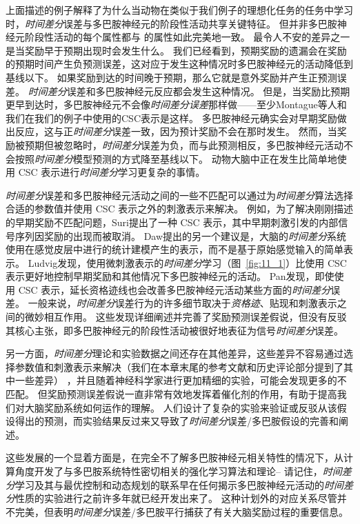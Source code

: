 上面描述的例子解释了为什么当动物在类似于我们例子的理想化任务的任务中学习时，\textit{时间差分}误差与多巴胺神经元的阶段性活动共享关键特征。
但并非多巴胺神经元阶段性活动的每个属性都与 的属性如此完美地一致。
最令人不安的差异之一是当奖励早于预期出现时会发生什么。
我们已经看到，预期奖励的遗漏会在奖励的预期时间产生负预测误差，这对应于发生这种情况时多巴胺神经元的活动降低到基线以下。
如果奖励到达的时间晚于预期，那么它就是意外奖励并产生正预测误差。
\textit{时间差分}误差和多巴胺神经元反应都会发生这种情况。
但是，当奖励比预期更早到达时，多巴胺神经元不会像\textit{时间差分误差}那样做——至少Montague等人\cite{montague1996framework}和我们在我们的例子中使用的CSC表示是这样。
多巴胺神经元确实会对早期奖励做出反应，这与正\textit{时间差分}误差一致，因为预计奖励不会在那时发生。
然而，当奖励被预期但被忽略时，\textit{时间差分}误差为负，而与此预测相反，多巴胺神经元活动不会按照\textit{时间差分}模型预测的方式降至基线以下\cite{hollerman1998dopamine}。
动物大脑中正在发生比简单地使用 CSC 表示进行\textit{时间差分}学习更复杂的事情。



\textit{时间差分}误差和多巴胺神经元活动之间的一些不匹配可以通过为\textit{时间差分}算法选择合适的参数值并使用 CSC 表示之外的刺激表示来解决。
例如，为了解决刚刚描述的早期奖励不匹配问题，Suri\cite{suri1999neural}提出了一种 CSC 表示，其中早期刺激引发的内部信号序列因奖励的出现而被取消。
Daw\cite{daw2006representation}提出的另一个建议是，大脑的\textit{时间差分}系统使用在感觉皮层中进行的统计建模产生的表示，而不是基于原始感觉输入的简单表示。
Ludvig\cite{ludvig2008stimulus}发现，使用微刺激表示的\textit{时间差分}学习（图~\ref{fig:11_1}）比使用 CSC 表示更好地控制早期奖励和其他情况下多巴胺神经元的活动。
Pan\cite{pan2005dopamine}发现，即使使用 CSC 表示，延长资格迹线也会改善多巴胺神经元活动某些方面的\textit{时间差分}误差。
一般来说，\textit{时间差分}误差行为的许多细节取决于\textit{资格迹}、贴现和刺激表示之间的微妙相互作用。
这些发现详细阐述并完善了奖励预测误差假说，但没有反驳其核心主张，即多巴胺神经元的阶段性活动被很好地表征为信号\textit{时间差分}误差。


另一方面，\textit{时间差分}理论和实验数据之间还存在其他差异，这些差异不容易通过选择参数值和刺激表示来解决（我们在本章末尾的参考文献和历史评论部分提到了其中一些差异） ，并且随着神经科学家进行更加精细的实验，可能会发现更多的不匹配。
但奖励预测误差假说一直非常有效地发挥着催化剂的作用，有助于提高我们对大脑奖励系统如何运作的理解。
人们设计了复杂的实验来验证或反驳从该假设得出的预测，而实验结果反过来又导致了\textit{时间差分}误差/多巴胺假设的完善和阐述。


这些发展的一个显着方面是，在完全不了解多巴胺神经元相关特性的情况下，从计算角度开发了与多巴胺系统特性密切相关的强化学习算法和理论-- 请记住，\textit{时间差分}学习及其与最优控制和动态规划的联系早在任何揭示多巴胺神经元活动的\textit{时间差分}性质的实验进行之前许多年就已经开发出来了。
这种计划外的对应关系尽管并不完美，但表明\textit{时间差分}误差/多巴胺平行捕获了有关大脑奖励过程的重要信息。


